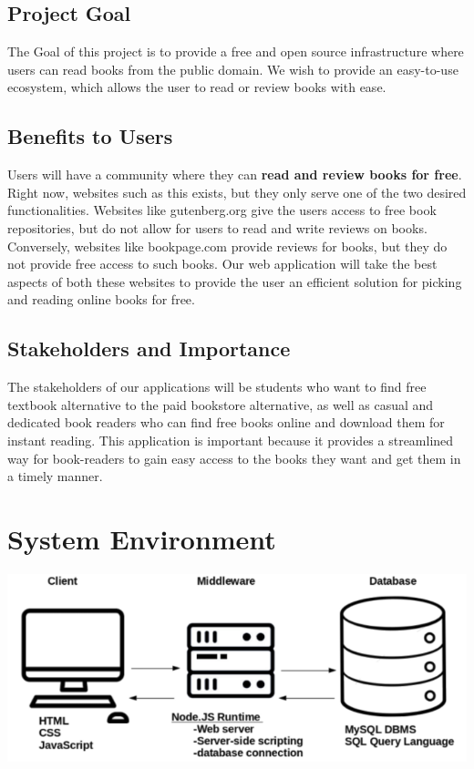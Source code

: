 \documentclass[letter, 12pt, titlepage]{article}
\begin{document}
	\subsection{Project Goal}
	The Goal of this project is to provide a free and open source infrastructure where users can read books from the public domain. We wish to provide an easy-to-use ecosystem, which allows the user to read or review books with ease.
	\subsection{Benefits to Users}
	Users will have a community where they can \textbf{read and review books for free}. Right now, websites such as this exists, but they only serve one of the two desired functionalities. Websites like gutenberg.org give the users access to free book repositories, but do not allow for users to read and write reviews on books. Conversely, websites like bookpage.com provide reviews for books, but they do not provide free access to such books. Our web application will take the best aspects of both these websites to provide the user an efficient solution for picking and reading online books for free.
    \subsection{Stakeholders and Importance}
    The stakeholders of our applications will be students who want to find free textbook alternative to the paid bookstore alternative, as well as casual and dedicated book readers who can find free books online and download them for instant reading. This application is important because it provides a streamlined way for book-readers to gain easy access to the books they want and get them in a timely manner.


	\section{System Environment}
	
			\includegraphics[scale=.66]{3-tier.png}
\end{document}
